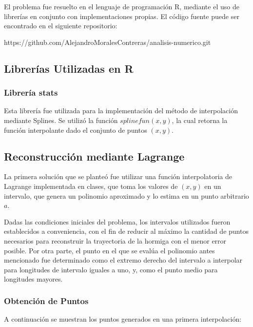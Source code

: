 \documentclass[conference]{IEEEtran}
\begin{document}
El problema fue resuelto en el lenguaje de programación R, mediante el uso de librerías en conjunto con implementaciones propias. El código fuente puede ser encontrado en el siguiente repositorio: \par

https://github.com/AlejandroMoralesContreras/analisis-numerico.git \par

\subsection{Librerías Utilizadas en R}

\subsubsection{Librería stats}

Esta librería fue utilizada para la implementación del método de interpolación mediante Splines. Se utilizó la función $splinefun(x, y)$, la cual retorna la función interpolante dado el conjunto de puntos $(x,y)$.

\subsection{Reconstrucción mediante Lagrange}

La primera solución que se planteó fue utilizar una función interpolatoria de Lagrange implementada en clases, que toma los valores de $(x,y)$ en un intervalo, que genera un polinomio aproximado y lo estima en un punto arbitrario $a$.\par

Dadas las condiciones iniciales del problema, los intervalos utilizados fueron establecidos a conveniencia, con el fin de reducir al máximo la cantidad de puntos necesarios para reconstruir la trayectoria de la hormiga con el menor error posible.
Por otra parte, el punto en el que se evalúa el polinomio antes mencionado fue determinado como el extremo derecho del intervalo a interpolar para longitudes de intervalo iguales a uno, y, como el punto medio para longitudes mayores.\par

\subsubsection{Obtención de Puntos}

A continuación se muestran los puntos generados en una primera interpolación: \par
\end{document}
